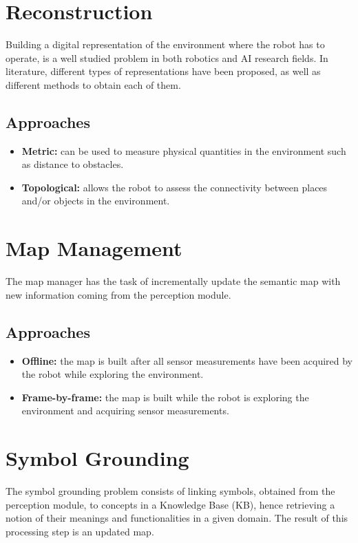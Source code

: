 \documentclass{article}
\begin{document}
	\section{Reconstruction}
	
	Building a digital representation of the environment where the robot has to operate, is a well studied problem in both robotics and AI research fields. In literature,  different types of representations have been proposed, as well as different methods to obtain each of them.
	
	\subsection{Approaches}
	
	\begin{itemize}
		\item {\bf Metric:} can be used to measure physical quantities in the environment such as distance to obstacles.
		\item {\bf Topological:} allows the robot to assess the connectivity between places and/or objects in the environment.
	\end{itemize}
	
	\section{Map Management}
	
	The map manager has the task of incrementally update the semantic map with new information coming from the perception module.
	
	\subsection{Approaches}
	
	\begin{itemize}
		\item {\bf Offline:} the map is built after all sensor measurements have been acquired by the robot while exploring the environment.
		\item {\bf Frame-by-frame:} the map is built while the robot is exploring the environment and acquiring sensor measurements.
	\end{itemize}
	
	\section{Symbol Grounding}
	
	The symbol grounding problem consists of linking symbols, obtained from the perception module, to concepts in a Knowledge Base (KB), hence retrieving a notion	of their meanings and functionalities in a given domain. The result of this processing step is an updated map.
	
\end{document}
